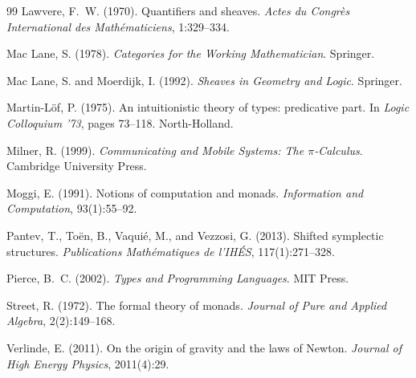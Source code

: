 \documentclass[12pt, a4paper]{article}
\theoremstyle{definition}
\theoremstyle{remark}
\begin{document}
\begin{thebibliography}{99}
Lawvere, F.~W. (1970). Quantifiers and sheaves.
\emph{Actes du Congrès International des Mathématiciens}, 1:329--334.

Mac Lane, S. (1978). \emph{Categories for the Working Mathematician}. Springer.

Mac Lane, S. and Moerdijk, I. (1992).
\emph{Sheaves in Geometry and Logic}. Springer.

Martin-L\"of, P. (1975). An intuitionistic theory of types: predicative part.
In \emph{Logic Colloquium '73}, pages 73--118. North-Holland.

Milner, R. (1999). \emph{Communicating and Mobile Systems: The $\pi$-Calculus}.
Cambridge University Press.

Moggi, E. (1991). Notions of computation and monads.
\emph{Information and Computation}, 93(1):55--92.

Pantev, T., To\"en, B., Vaqui\'e, M., and Vezzosi, G. (2013).
Shifted symplectic structures.
\emph{Publications Mathématiques de l'IHÉS}, 117(1):271--328.

Pierce, B.~C. (2002). \emph{Types and Programming Languages}. MIT Press.

Street, R. (1972). The formal theory of monads.
\emph{Journal of Pure and Applied Algebra}, 2(2):149--168.

Verlinde, E. (2011). On the origin of gravity and the laws of Newton.
\emph{Journal of High Energy Physics}, 2011(4):29.

\end{thebibliography}
\end{document}
